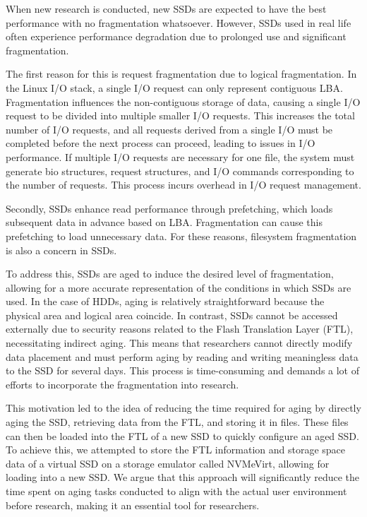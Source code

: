 When new research is conducted, new SSDs are expected to have the best performance with no fragmentation whatsoever.
However, SSDs used in real life often experience performance degradation due to prolonged use and significant fragmentation.

The first reason for this is request fragmentation due to logical fragmentation.
In the Linux I/O stack, a single I/O request can only represent contiguous LBA.
Fragmentation influences the non-contiguous storage of data, causing a single I/O request to be divided into multiple smaller I/O requests.\cite{IO}
This increases the total number of I/O requests, and all requests derived from a single I/O must be completed before the next process can proceed, leading to issues in I/O performance.
If multiple I/O requests are necessary for one file, the system must generate bio structures, request structures, and I/O commands corresponding to the number of requests.
This process incurs overhead in I/O request management.

Secondly, SSDs enhance read performance through prefetching, which loads subsequent data in advance based on LBA.
Fragmentation can cause this prefetching to load unnecessary data.\cite{defrag-lfs:apsys16} For these reasons, filesystem fragmentation is also a concern in SSDs.


To address this, SSDs are aged to induce the desired level of fragmentation, allowing for a more accurate representation of the conditions in which SSDs are used.
In the case of HDDs, aging is relatively straightforward because the physical area and logical area coincide.
In contrast, SSDs cannot be accessed externally due to security reasons related to the Flash Translation Layer (FTL), necessitating indirect aging.
This means that researchers cannot directly modify data placement and must perform aging by reading and writing meaningless data to the SSD for several days.
This process is time-consuming and demands a lot of efforts to incorporate the fragmentation into research.


This motivation led to the idea of reducing the time required for aging by directly aging the SSD, retrieving data from the FTL, and storing it in files.
These files can then be loaded into the FTL of a new SSD to quickly configure an aged SSD.
To achieve this, we attempted to store the FTL information and storage space data of a virtual SSD on a storage emulator called NVMeVirt, allowing for loading into a new SSD.
We argue that this approach will significantly reduce the time spent on aging tasks conducted to align with the actual user environment before research, making it an essential tool for researchers.


